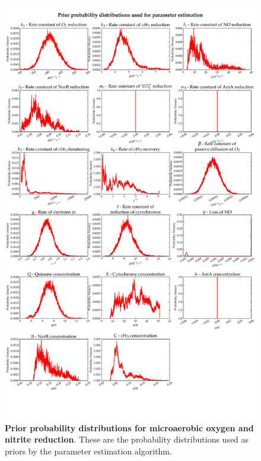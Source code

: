 \begin{figure}[tbp]
 \centering
 \includegraphics[width=15cm, trim=0cm 4.1cm 0cm 1cm, clip=true]{./07-nitritereduction/data/priors1.pdf}
 \caption[Prior probability distributions for microaerobic oxygen and nitrite reduction]{{\bf Prior probability distributions for microaerobic oxygen and nitrite reduction}. These are the probability distributions used as priors by the parameter estimation algorithm.
 \label{fig:nitrite_priors1}}
\end{figure}
\afterpage{\clearpage}

